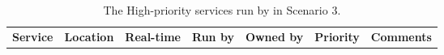 \begin{center}
\begin{table}
\begin{tabular}{p{\mycolwidth} p{\mycolwidth} l l l l p{\mycolwidth}}
{\bf \tiny Service}  & {\bf \tiny Location} & \bf {\tiny Real-time} & {\bf \tiny Run by} & \bf {\tiny Owned by} & {\bf \tiny Priority} & {\bf \tiny Comments} \\

\end{tabular}
\caption{The High-priority \einfra services run by \EC in Scenario 3. \label{tab:services:s3}}
\end{table}
\end{center}
